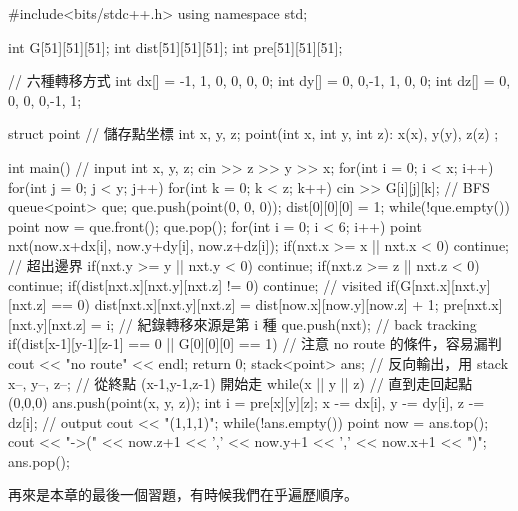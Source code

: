 \begin{C++}
#include<bits/stdc++.h>
using namespace std;

int G[51][51][51];
int dist[51][51][51];
int pre[51][51][51];

// 六種轉移方式
int dx[] = {-1, 1, 0, 0, 0, 0};
int dy[] = { 0, 0,-1, 1, 0, 0};
int dz[] = { 0, 0, 0, 0,-1, 1};

struct point{ // 儲存點坐標
    int x, y, z;
    point(int x, int y, int z): x(x), y(y), z(z){}
};

int main(){
    // input
    int x, y, z;
    cin >> z >> y >> x;
    for(int i = 0; i < x; i++){
        for(int j = 0; j < y; j++){
            for(int k = 0; k < z; k++)
                cin >> G[i][j][k];
        }
    }
    // BFS
    queue<point> que;
    que.push(point(0, 0, 0));
    dist[0][0][0] = 1;
    while(!que.empty()){
        point now = que.front();
        que.pop();
        for(int i = 0; i < 6; i++){
            point nxt(now.x+dx[i], now.y+dy[i], now.z+dz[i]);
            if(nxt.x >= x || nxt.x < 0) continue; // 超出邊界
            if(nxt.y >= y || nxt.y < 0) continue;
            if(nxt.z >= z || nxt.z < 0) continue;
            if(dist[nxt.x][nxt.y][nxt.z] != 0) continue; // visited
            if(G[nxt.x][nxt.y][nxt.z] == 0){
                dist[nxt.x][nxt.y][nxt.z] = dist[now.x][now.y][now.z] + 1;
                pre[nxt.x][nxt.y][nxt.z] = i; // 紀錄轉移來源是第 i 種
                que.push(nxt);
            }
        }
    }
    // back tracking
    if(dist[x-1][y-1][z-1] == 0 || G[0][0][0] == 1){
        // 注意 no route 的條件，容易漏判
        cout << "no route" << endl;
        return 0;
    }
    stack<point> ans; // 反向輸出，用 stack
    x--, y--, z--; // 從終點 (x-1,y-1,z-1) 開始走
    while(x || y || z){ // 直到走回起點 (0,0,0)
        ans.push(point(x, y, z));
        int i = pre[x][y][z];
        x -= dx[i], y -= dy[i], z -= dz[i];
    }
    // output
    cout << "(1,1,1)";
    while(!ans.empty()){
        point now = ans.top();
        cout << "->(" << now.z+1 << ',' << now.y+1 << ',' << now.x+1 << ")";
        ans.pop();
    }
}
\end{C++}


再來是本章的最後一個習題，有時候我們在乎遍歷順序。\\

